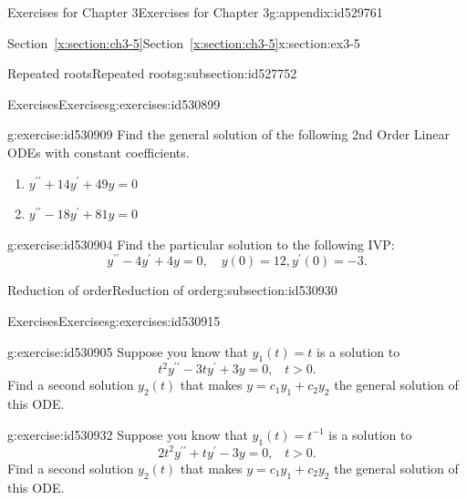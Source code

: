 \documentclass[oneside,10pt,]{book}
\newcommand{\xreffont}{\relax}
\numberwithin{equation}{section}
\numberwithin{equation}{section}
\begin{document}
\begin{appendixptx}{Exercises for Chapter 3}{}{Exercises for Chapter 3}{}{}{g:appendix:id529761}
\begin{sectionptx}{Section~{\xreffont\ref*{x:section:ch3-5}}}{}{Section~{\xreffont\ref*{x:section:ch3-5}}}{}{}{x:section:ex3-5}
\begin{subsectionptx}{Repeated roots}{}{Repeated roots}{}{}{g:subsection:id527752}
\begin{exercises-subsubsection-numberless}{Exercises}{}{Exercises}{}{}{g:exercises:id530899}
\begin{divisionexercise}{1}{}{}{g:exercise:id530909}%
Find the general solution of the following 2nd Order Linear ODEs with constant coefficients.%
%
\begin{enumerate}[label=(\alph*)]
\item{}\(\displaystyle y^{\prime\prime}+14y^{\prime}+49y=0\)%
\item{}\(\displaystyle y^{\prime\prime}-18y^{\prime}+81y=0\)%
\end{enumerate}
\end{divisionexercise}%
\begin{divisionexercise}{2}{}{}{g:exercise:id530904}%
Find the particular solution to the following IVP:%
%
\begin{equation*}
y^{\prime\prime}-4y^{\prime}+4y=0,\,\,\,\,\,\,y(0)=12,y^{\prime}(0)=-3.
\end{equation*}
\end{divisionexercise}%
\end{exercises-subsubsection-numberless}
\end{subsectionptx}
%
%
\typeout{************************************************}
\typeout{************************************************}
%
\begin{subsectionptx}{Reduction of order}{}{Reduction of order}{}{}{g:subsection:id530930}
%
%
\typeout{************************************************}
\typeout{************************************************}
%
\begin{exercises-subsubsection-numberless}{Exercises}{}{Exercises}{}{}{g:exercises:id530915}
\begin{divisionexercise}{1}{}{}{g:exercise:id530905}%
Suppose you know that \(y_{1}(t)=t\) is a solution to%
\begin{equation*}
t^{2}y^{\prime\prime}-3ty^{\prime}+3y=0,\,\,\,\,\,t>0.
\end{equation*}
Find a second solution \(y_{2}(t)\) that makes \(y=c_{1}y_{1}+c_{2}y_{2}\) the general solution of this ODE.%
\end{divisionexercise}%
\begin{divisionexercise}{2}{}{}{g:exercise:id530932}%
Suppose you know that \(y_{1}(t)=t^{-1}\) is a solution to%
\begin{equation*}
2t^{2}y^{\prime\prime}+ty^{\prime}-3y=0,\,\,\,\,\,t>0.
\end{equation*}
Find a second solution \(y_{2}(t)\) that makes \(y=c_{1}y_{1}+c_{2}y_{2}\) the general solution of this ODE.%

\end{divisionexercise}
\end{exercises-subsubsection-numberless}
\end{subsectionptx}
\end{sectionptx}
\end{appendixptx}
\end{document}

